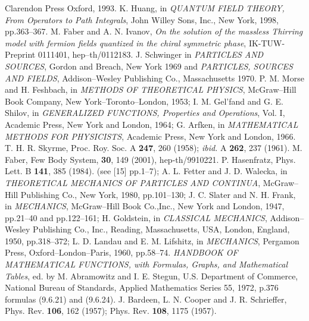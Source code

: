 \documentclass[a4paper,12pt] {article}
\begin{document}
\begin{thebibliography}{9}
Clarendon Press \myHighlight{$\,\bullet\,$}\coordHE{} Oxford, 1993.
\bibitem{[15]}
K. Huang,
in {\it QUANTUM FIELD THEORY, From Operators to Path Integrals}, 
John Willey \myHighlight{$\&$}\coordHE{} Sons, Inc., New York, 1998, pp.363--367.
\bibitem{[16]}
M. Faber and A. N. Ivanov,
{\it On the solution of the massless
Thirring model  with fermion
fields quantized in the chiral symmetric phase},
IK-TUW-Preprint 0111401, hep--th/0112183.
\bibitem{[17]} 
J. Schwinger 
in {\it PARTICLES AND SOURCES}, Gordon and
Breach, New York 1969 and 
{\it PARTICLES, SOURCES AND FIELDS},
Addison--Wesley Publishing Co., Massachusetts 1970.
\bibitem{[18]}
P. M. Morse and H. Feshbach,
in {\it METHODS OF THEORETICAL PHYSICS}, McGraw--Hill  
Book Company, New York--Toronto--London, 1953;
I. M. Gel'fand and G. E. Shilov,
in {\it GENERALIZED FUNCTIONS, Properties and Operations}, Vol. I, 
Academic Press, New York and London, 1964;
G. Arfken,
in {\it MATHEMATICAL METHODS FOR PHYSICISTS}, Academic Press,
New York and London, 1966.
\bibitem{[19]} 
T. H. R. Skyrme, Proc. Roy. Soc. A {\bf 247}, 260
(1958); {\it ibid.} A {\bf 262}, 237 (1961).
\bibitem{[20]}
M. Faber,
Few Body System, {\bf 30}, 149 (2001), hep-th/9910221.
\bibitem{[21]}
P. Hasenfratz,
Phys. Lett. B {\bf 141}, 385 (1984).
\bibitem{[22]} 
(see [15] pp.1--7);
A. L. Fetter and J. D. Walecka,
in {\it THEORETICAL MECHANICS OF PARTICLES AND CONTINUA},
McGraw--Hill Publishing Co., New York, 1980, pp.101--130;
J. C. Slater and N. H. Frank,
in {\it MECHANICS}, McGraw--Hill Book Co.,Inc., New York and London,
1947, pp.21--40 and pp.122--161;
H. Goldstein, in {\it CLASSICAL MECHANICS},
Addison--Wesley Publishing Co., Inc., Reading, Massachusetts, USA,
London, England, 1950, pp.318--372;
L. D. Landau and E. M. Lifshitz,
in {\it MECHANICS}, Pergamon Press, 
Oxford--London--Paris, 1960, pp.58--74.
\bibitem{[23]} 
{\it HANDBOOK OF MATHEMATICAL FUNCTIONS, with Formulas,
Graphs, and Mathematical Tables}, ed. by M. Abramowitz and
I. E. Stegun, U.S. Department of Commerce, National Bureau of
Standards, Applied Mathematics Series \myHighlight{$\bullet$}\coordHE{} 55, 1972, p.376 
formulas (9.6.21) and (9.6.24).
\bibitem{[24]} 
J. Bardeen, L. N. Cooper and J. R. Schrieffer,
Phys. Rev. {\bf 106}, 162 (1957); Phys. Rev. {\bf 108}, 1175 (1957).
\end{thebibliography}
\end{document}

